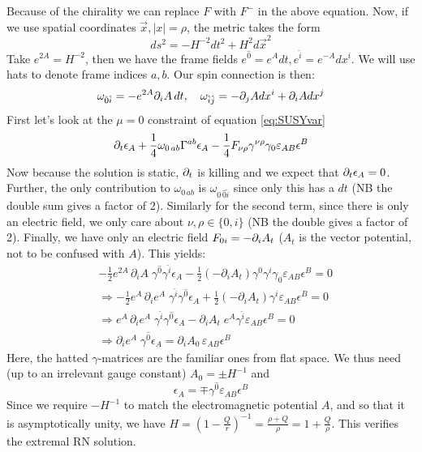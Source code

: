\documentclass[11pt, class=article, crop=false]{standalone}
\begin{document}
\begin{enumerate}
	Because of the chirality we can replace $F$ with $F^-$ in the above equation. Now, if we use spatial coordinates $\vec x, |x| = \rho$, the metric takes the form
	\[
		ds^2 = -H^{-2} dt^2 + H^2 d\vec x^2
	\]
	Take $e^{2A}= H^{-2}$, then we have the frame fields $e^{\hat 0} = e^{A} dt, e^{\hat i} = e^{-A} dx^i$. We will use hats to denote frame indices $a,b$. Our spin connection is then:
	\[
		\omega_{\hat 0 \hat i} = - e^{2A} \partial_i A \,dt, \quad \omega_{\hat i \hat j} = - \partial_j A dx^i + \partial_i A dx^j
	\]
	First let's look at the $\mu= 0$ constraint of equation \eqref{eq:SUSYvar}
	\[
		\partial_t \epsilon_A + \frac14 \omega_{0\, ab} \Gamma^{ab} \epsilon_A - \frac14 F_{\nu \rho} \gamma^{\nu \rho} \gamma_0 \varepsilon_{AB} \epsilon^B
	\]
	Now because the solution is static, $\partial_t$ is killing and we expect that $\partial_t \epsilon_A = 0$. Further, the only contribution to $\omega_{0\, ab}$ is $\omega_{0 \, \hat 0 \hat i}$ since only this has a $dt$ (NB the double sum gives a factor of 2). Similarly for the second term, since there is only an electric field, we only care about $\nu,\rho \in \{0,i\}$ (NB the double gives a factor of 2). Finally, we have only an electric field $F_{0i} = -\partial_i A_t$ ($A_t$ is the vector potential, not to be confused with $A$). This yields:
	\[
	\begin{aligned}
		&-\frac12 e^{2A} \, \partial_i A\; \gamma^{\hat 0} \gamma^{\hat i} \epsilon_A  - \frac12 (-\partial_i A_t) \gamma^{0} \gamma^{i} \gamma_0 \varepsilon_{AB} \epsilon^B = 0\\
		&\Rightarrow -\frac12 e^{A} \, \partial_i e^{A}\; \gamma^{\hat i} \gamma^{\hat 0} \epsilon_A  + \frac12 (-\partial_i A_t) \gamma^{i} \varepsilon_{AB} \epsilon^B = 0\\
		&\Rightarrow e^A \, \partial_i e^A \; \gamma^{\hat i} \gamma^{\hat 0} \epsilon_A  - \partial_i A_t \; e^A \gamma^{\hat i} \varepsilon_{AB} \epsilon^B = 0\\
		 &{\Rightarrow \partial_i e^{A} \; \gamma^{\hat 0} \epsilon_A = \partial_i A_0 \,  \varepsilon_{AB} \epsilon^B} 
	\end{aligned}
	\]
	Here, the hatted $\gamma$-matrices are the familiar ones from flat space. 
	We thus need (up to an irrelevant gauge constant) $A_0 = \pm H^{-1}$ and
	\begin{equation}\label{eq:spinorconstraint}
		\epsilon_A = \mp \gamma^{\hat 0} \varepsilon_{AB} \epsilon^B
	\end{equation}
	Since we require $-H^{-1}$ to match the electromagnetic potential $A$, and so that it is asymptotically unity, we have $H = (1 - \frac{Q}{r})^{-1} = \frac{\rho+Q}{\rho} = 1 + \frac{Q}{\rho}$. This verifies the extremal RN solution. 
	

\end{enumerate}
\end{document}
